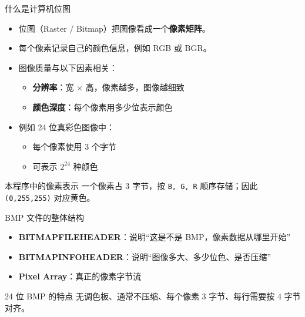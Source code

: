 \documentclass[aspectratio=169,11pt]{beamer}
\begin{document}
\begin{frame}{什么是计算机位图}
\begin{itemize}
  \item 位图（Raster / Bitmap）把图像看成一个\textbf{像素矩阵}。
  \item 每个像素记录自己的颜色信息，例如 RGB 或 BGR。
  \item 图像质量与以下因素相关：
  \begin{itemize}
    \item \textbf{分辨率}：宽 $\times$ 高，像素越多，图像越细致
    \item \textbf{颜色深度}：每个像素用多少位表示颜色
  \end{itemize}
  \item 例如 24 位真彩色图像中：
  \begin{itemize}
    \item 每个像素使用 3 个字节
    \item 可表示 $2^{24}$ 种颜色
  \end{itemize}
\end{itemize}

\begin{block}{本程序中的像素表示}
一个像素占 3 字节，按 \texttt{B, G, R} 顺序存储；因此 \texttt{(0,255,255)} 对应黄色。
\end{block}
\end{frame}

\begin{frame}{BMP 文件的整体结构}
\begin{center}
\end{center}

\vspace{0.4em}
\begin{itemize}
  \item \textbf{BITMAPFILEHEADER}：说明“这是不是 BMP，像素数据从哪里开始”
  \item \textbf{BITMAPINFOHEADER}：说明“图像多大、多少位色、是否压缩”
  \item \textbf{Pixel Array}：真正的像素字节流
\end{itemize}

\begin{exampleblock}{24 位 BMP 的特点}
无调色板、通常不压缩、每个像素 3 字节、每行需要按 4 字节对齐。
\end{exampleblock}
\end{frame}
\end{document}

